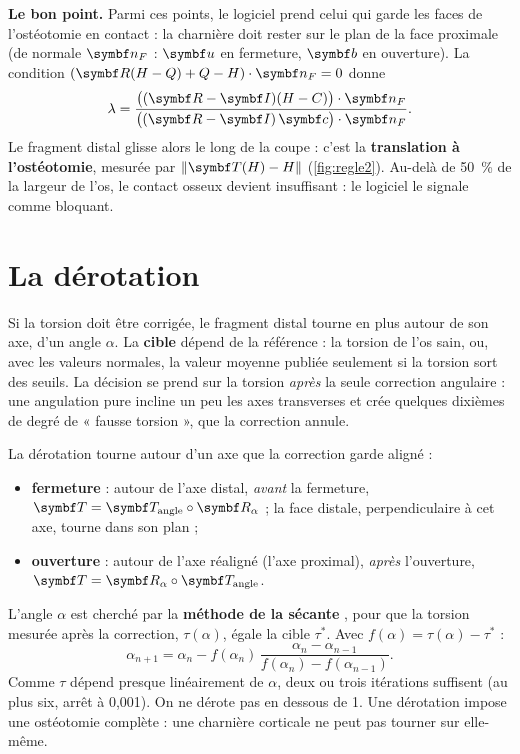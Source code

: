 \textbf{Le bon point.} Parmi ces points, le logiciel prend celui qui garde les faces de l'ostéotomie en contact : la
charnière doit rester sur le plan de la face proximale (de normale $\vb{n}_F$ : $\vb{u}$ en fermeture, $\vb{b}$ en
ouverture). La condition $(\mt{R}(H - Q) + Q - H)\cdot\vb{n}_F = 0$ donne
\begin{equation}
  \lambda = \frac{\bigl((\mt{R} - \mt{I})(H - C)\bigr)\cdot\vb{n}_F}{\bigl((\mt{R} - \mt{I})\,\vb{c}\bigr)\cdot\vb{n}_F}.
\end{equation}
Le fragment distal glisse alors le long de la coupe : c'est la \textbf{translation à l'ostéotomie}, mesurée par
$\norm{\mt{T}(H) - H}$ (\cref{fig:regle2}). Au-delà de 50~\% de la largeur de l'os, le contact osseux devient
insuffisant : le logiciel le signale comme bloquant.


\section{La dérotation}
\label{sec:derotation}

Si la torsion doit être corrigée, le fragment distal tourne en plus autour de son axe, d'un angle $\alpha$. La
\textbf{cible} dépend de la référence : la torsion de l'os sain, ou, avec les valeurs normales, la valeur moyenne
publiée seulement si la torsion sort des seuils. La décision se prend sur la torsion \emph{après} la seule correction
angulaire : une angulation pure incline un peu les axes transverses et crée quelques dixièmes de degré de « fausse
torsion », que la correction annule.

La dérotation tourne autour d'un axe que la correction garde aligné :
\begin{itemize}
  \item \textbf{fermeture} : autour de l'axe distal, \emph{avant} la fermeture, $\mt{T} = \mt{T}_{\text{angle}} \circ
  \mt{R}_\alpha$ ; la face distale, perpendiculaire à cet axe, tourne dans son plan ;
  \item \textbf{ouverture} : autour de l'axe réaligné (l'axe proximal), \emph{après} l'ouverture,
  $\mt{T} = \mt{R}_\alpha \circ \mt{T}_{\text{angle}}$.
\end{itemize}

L'angle $\alpha$ est cherché par la \textbf{méthode de la sécante} \cite{press2007}, pour que la torsion mesurée après
la correction, $\tau(\alpha)$, égale la cible $\tau^*$. Avec $f(\alpha) = \tau(\alpha) - \tau^*$ :
\begin{equation}
  \alpha_{n+1} = \alpha_n - f(\alpha_n)\,\frac{\alpha_n - \alpha_{n-1}}{f(\alpha_n) - f(\alpha_{n-1})}.
\end{equation}
Comme $\tau$ dépend presque linéairement de $\alpha$, deux ou trois itérations suffisent (au plus six, arrêt à
0,001\degre). On ne dérote pas en dessous de 1\degre. Une dérotation impose une ostéotomie complète : une charnière
corticale ne peut pas tourner sur elle-même.

